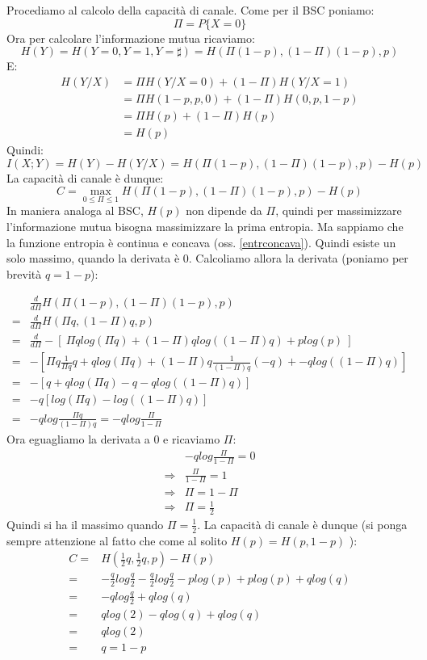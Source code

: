 \noindent
Procediamo al calcolo della capacità di canale. Come per il BSC poniamo:
\[
 \Pi=P\{X=0\}
\]
Ora per calcolare l'informazione mutua ricaviamo:
\[
 H(Y)=H(Y=0,Y=1,Y=\sharp)=H(\Pi (1-p), (1-\Pi) (1-p), p)
\]
E:
\[\begin{split}
 H(Y/X)&=\Pi H(Y/X=0) + (1-\Pi) H(Y/X=1) \\
       &=\Pi H(1-p,p,0) + (1-\Pi) H(0,p,1-p) \\
       &=\Pi H(p) + (1-\Pi) H(p) \\
       &=H(p)
  \end{split}
\]
Quindi:
\[
 I(X;Y)=H(Y)-H(Y/X)=H(\Pi (1-p), (1-\Pi) (1-p), p) - H(p)
\]
La capacità di canale è dunque:
\[
 C=\max_{0 \le \Pi \le 1} H(\Pi (1-p), (1-\Pi) (1-p), p) - H(p)
\]
In maniera analoga al BSC, $H(p)$ non dipende da $\Pi$, quindi per massimizzare 
l'informazione mutua bisogna massimizzare la prima entropia.
Ma sappiamo che la funzione entropia è continua e concava (oss. \ref{entrconcava}).
Quindi esiste un solo massimo, quando la derivata è 0. Calcoliamo allora la derivata
(poniamo per brevità $q=1-p$):

\[\begin{split}
 &\frac{d}{d \Pi}  H(\Pi (1-p), (1-\Pi) (1-p), p) \\
 =&\frac{d}{d \Pi} H(\Pi q, (1-\Pi) q, p) \\
 =&\frac{d}{d \Pi} - [ \ \Pi q log(\Pi q) + (1-\Pi) q log((1-\Pi)q) + plog(p) \ ] \\
 =&-[\Pi q \frac{1}{\Pi q} q + q log(\Pi q) + (1-\Pi)q \frac{1}{(1-\Pi)q} (-q) + -qlog((1-\Pi)q) ] \\
 =&-[q + q log(\Pi q) -q -qlog((1-\Pi)q) ] \\
 =&-q[log(\Pi q) -log((1-\Pi)q) ] \\
 =&-qlog \frac{\Pi q}{(1-\Pi)q}=-qlog \frac{\Pi}{1-\Pi}
  \end{split}
\]
Ora eguagliamo la derivata a 0 e ricaviamo $\Pi$:
\[\begin{split}
 &-qlog \frac{\Pi}{1-\Pi}=0 \\
 \Rightarrow &\frac{\Pi}{1-\Pi}=1 \\
 \Rightarrow &\Pi=1-\Pi \\
\Rightarrow &\Pi=\frac{1}{2}
  \end{split}
\]
Quindi si ha il massimo quando $\Pi=\frac{1}{2}$.
La capacità di canale è dunque (si ponga sempre attenzione al fatto che come al solito $H(p)=H(p,1-p)$ ):
\[\begin{split}
C=&H(\frac{1}{2} q, \frac{1}{2} q, p) - H(p) \\
=& -\frac{q}{2} log\frac{q}{2} - \frac{q}{2} log\frac{q}{2}  - plog(p) +p log(p) +q log(q)\\
=&-qlog\frac{q}{2}+q log(q)  \\
=&qlog(2) -qlog(q) +q log(q)\\
=&qlog(2) \\
=&q=1-p
\end{split}
\]

